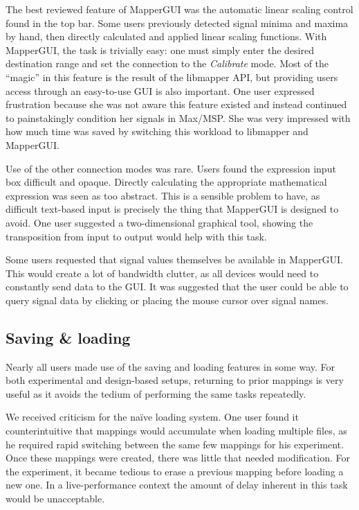 The best reviewed feature of MapperGUI was the automatic linear scaling control found in the top bar. Some users previously detected signal minima and maxima by hand, then directly calculated and applied linear scaling functions. With MapperGUI, the task is trivially easy: one must simply enter the desired destination range and set the connection to the \emph{Calibrate} mode. Most of the ``magic'' in this feature is the result of the libmapper API, but providing users access through an easy-to-use GUI is also important. One user expressed frustration because she was not aware this feature existed and instead continued to painstakingly condition her signals in Max/MSP. She was very impressed with how much time was saved by switching this workload to libmapper and MapperGUI.

Use of the other connection modes was rare. Users found the expression input box difficult and opaque. Directly calculating the appropriate mathematical expression was seen as too abstract. This is a sensible problem to have, as difficult text-based input is precisely the thing that MapperGUI is designed to avoid. One user suggested a two-dimensional graphical tool, showing the transposition from input to output would help with this task. 

Some users requested that signal values themselves be available in MapperGUI. This would create a lot of bandwidth clutter, as all devices would need to constantly send data to the GUI. It was suggested that the user could be able to query signal data by clicking or placing the mouse cursor over signal names.
	

	\subsection{Saving \& loading} %
	\label{sub:saving_and_loading}

Nearly all users made use of the saving and loading features in some way. For both experimental and design-based setups, returning to prior mappings is very useful as it avoids the tedium of performing the same tasks repeatedly.

We received criticism for the na\"ive loading system. One user found it counterintuitive that mappings would accumulate when loading multiple files, as he required rapid switching between the same few mappings for his experiment. Once these mappings were created, there was little that needed modification. For the experiment, it became tedious to erase a previous mapping before loading a new one. In a live-performance context the amount of delay inherent in this task would be unacceptable. 

